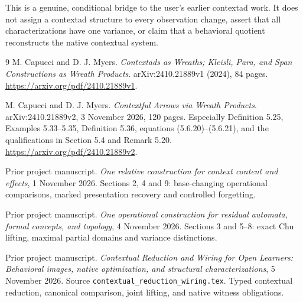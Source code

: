 \documentclass[11pt]{article}
\theoremstyle{definition}\newtheorem{definition}[theorem]{Definition}
\theoremstyle{remark}\newtheorem{remark}[theorem]{Remark}
\begin{document}
This is a genuine, conditional bridge to the user's earlier contextad work.
It does not assign a contextad structure to every observation change, assert
that all characterizations have one variance, or claim that a behavioral
quotient reconstructs the native contextual system.

\begin{thebibliography}{9}
 M. Capucci and D. J. Myers.
\emph{Contextads as Wreaths; Kleisli, Para, and Span Constructions as Wreath
Products}. arXiv:2410.21889v1 (2024), 84 pages.
\url{https://arxiv.org/pdf/2410.21889v1}.

 M. Capucci and D. J. Myers.
\emph{Contextful Arrows via Wreath Products}.
arXiv:2410.21889v2, 3 November 2026, 120 pages.
Especially Definition 5.25, Examples 5.33--5.35, Definition 5.36,
equations (5.6.20)--(5.6.21), and the qualifications in Section 5.4 and
Remark 5.20. \url{https://arxiv.org/pdf/2410.21889v2}.

 Prior project manuscript.
\emph{One relative construction for context content and effects},
1 November 2026. Sections 2, 4 and 9: base-changing operational comparisons,
marked presentation recovery and controlled forgetting.

 Prior project manuscript.
\emph{One operational construction for residual automata, formal concepts,
and topology}, 4 November 2026. Sections 3 and 5--8: exact Chu lifting,
maximal partial domains and variance distinctions.

 Prior project manuscript.
\emph{Contextual Reduction and Wiring for Open Learners: Behavioral images,
native optimization, and structural characterizations}, 5 November 2026.
Source \nolinkurl{contextual_reduction_wiring.tex}.
Typed contextual reduction, canonical comparison, joint lifting, and
native witness obligations.
\end{thebibliography}
\end{document}
